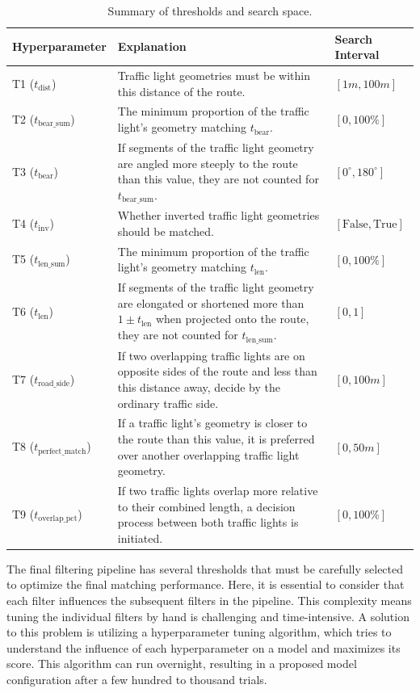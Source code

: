 \begin{table}[!b]
\caption{Summary of thresholds and search space.}
\begin{tabular}{@{}lp{8cm}l@{}}
\toprule
\textbf{Hyperparameter}  & \textbf{Explanation} & \textbf{Search Interval} \\
\midrule
T1 ($t_{\text{dist}}$) & Traffic light geometries must be within this distance of the route. & $[1m, 100m]$ \\
T2 ($t_{\text{bear\_sum}}$) & The minimum proportion of the traffic light's geometry matching $t_{\text{bear}}$. & $[0, 100\%]$ \\
T3 ($t_{\text{bear}}$) & If segments of the traffic light geometry are angled more steeply to the route than this value, they are not counted for $t_{\text{bear\_sum}}$. & $[0^{\circ}, 180^{\circ}]$ \\
T4 ($t_{\text{inv}}$) & Whether inverted traffic light geometries should be matched. & $[\text{False}, \text{True}]$ \\
T5 ($t_{\text{len\_sum}}$) & The minimum proportion of the traffic light's geometry matching $t_{\text{len}}$. & $[0, 100\%]$ \\
T6 ($t_{\text{len}}$) & If segments of the traffic light geometry are elongated or shortened more than $1 \pm t_{\text{len}}$ when projected onto the route, they are not counted for $t_{\text{len\_sum}}$. & $[0, 1]$\\
T7 ($t_{\text{road\_side}}$) & If two overlapping traffic lights are on opposite sides of the route and less than this distance away, decide by the ordinary traffic side. & $[0, 100m]$ \\
T8 ($t_{\text{perfect\_match}}$) & If a traffic light's geometry is closer to the route than this value, it is preferred over another overlapping traffic light geometry. & $[0, 50m]$ \\
T9 ($t_{\text{overlap\_pct}}$) & If two traffic lights overlap more relative to their combined length, a decision process between both traffic lights is initiated. & $[0, 100\%]$ \\
\bottomrule
\end{tabular}
\label{tab:hyperparameter-space}
\end{table}

The final filtering pipeline has several thresholds that must be carefully selected to optimize the final matching performance. Here, it is essential to consider that each filter influences the subsequent filters in the pipeline. This complexity means tuning the individual filters by hand is challenging and time-intensive. A solution to this problem is utilizing a hyperparameter tuning algorithm, which tries to understand the influence of each hyperparameter on a model and maximizes its score. This algorithm can run overnight, resulting in a proposed model configuration after a few hundred to thousand trials. 

